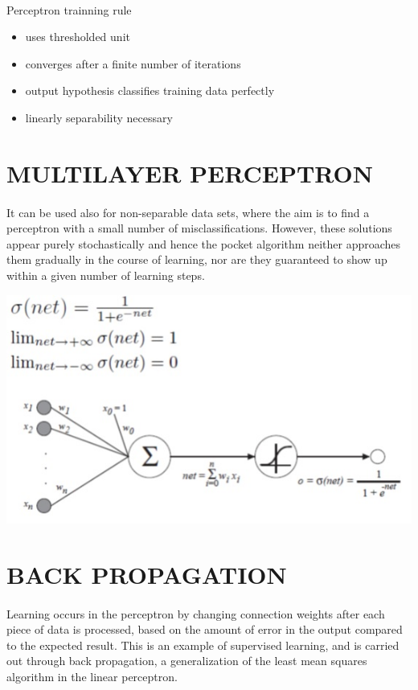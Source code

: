 \documentclass[10pt,a4paper,twoside]{report}
\begin{document}
\paragraph{ }Perceptron trainning rule
\begin{itemize}
\item uses thresholded unit
\item converges after a finite number of iterations
\item output hypothesis classifies training data perfectly
\item linearly separability necessary
\end{itemize}
\section{MULTILAYER PERCEPTRON }
\paragraph{ }It can be used also for non-separable data sets, where the aim is to find a perceptron with a small number of misclassifications. However, these solutions appear purely stochastically and hence the pocket algorithm neither approaches them gradually in the course of learning, nor are they guaranteed to show up within a given number of learning steps.
\begin{center}
\includegraphics[scale=.75]{mlp.jpg}
\end{center}

\section{BACK PROPAGATION}
\paragraph{ }Learning occurs in the perceptron by changing connection weights after each piece of data is processed, based on the amount of error in the output compared to the expected result. This is an example of supervised learning, and is carried out through back propagation, a generalization of the least mean squares algorithm in the linear perceptron.
\end{document}
